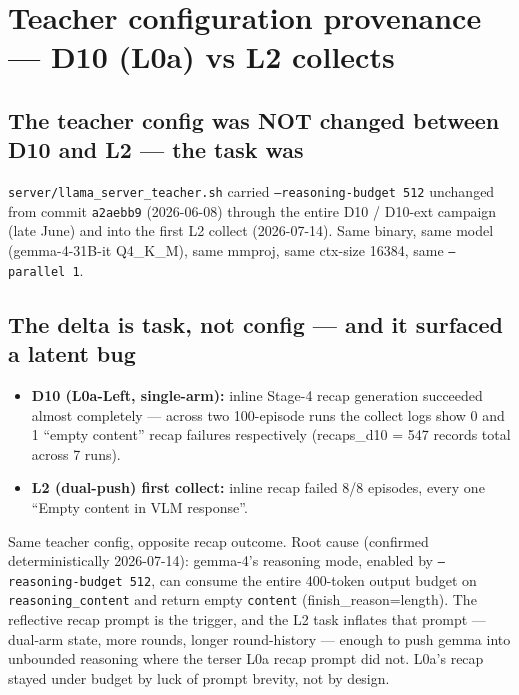
\section*{Teacher configuration provenance --- D10 (L0a) vs L2 collects}


\subsection*{The teacher config was NOT changed between D10 and L2 --- the task was}

\texttt{server/llama\_server\_teacher.sh} carried \texttt{--reasoning-budget 512}
unchanged from commit \texttt{a2aebb9} (2026-06-08) through the entire D10 /
D10-ext campaign (late June) and into the first L2 collect
(2026-07-14). Same binary, same model (gemma-4-31B-it Q4\_K\_M), same
mmproj, same ctx-size 16384, same \texttt{--parallel 1}.

\subsection*{The delta is task, not config --- and it surfaced a latent bug}

\begin{itemize}
\item \textbf{D10 (L0a-Left, single-arm):} inline Stage-4 recap generation
  succeeded almost completely --- across two 100-episode runs the
  collect logs show 0 and 1 ``empty content'' recap failures
  respectively (recaps\_d10 = 547 records total across 7 runs).
\item \textbf{L2 (dual-push) first collect:} inline recap failed 8/8 episodes,
  every one ``Empty content in VLM response''.
\end{itemize}

Same teacher config, opposite recap outcome. Root cause (confirmed
deterministically 2026-07-14): gemma-4's reasoning mode, enabled by
\texttt{--reasoning-budget 512}, can consume the entire 400-token output
budget on \texttt{reasoning\_content} and return empty \texttt{content}
(finish\_reason=length). The reflective recap prompt is the trigger,
and the L2 task inflates that prompt --- dual-arm state, more rounds,
longer round-history --- enough to push gemma into unbounded reasoning
where the terser L0a recap prompt did not. L0a's recap stayed under
budget by luck of prompt brevity, not by design.

